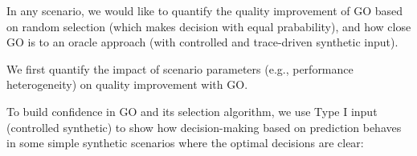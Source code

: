 In any scenario, we would like to quantify the quality improvement of GO based on random selection (which makes decision with equal prabability), and how close GO is to an oracle approach (with controlled and trace-driven synthetic input).



We first quantify the impact of scenario parameters (e.g., performance heterogeneity) on quality improvement with GO.

\begin{figure}[h!]
\centering
{}
\label{fig:behavioral}
\end{figure}

To build confidence in GO and its selection algorithm, we use Type I input (controlled synthetic) to show how decision-making based on prediction behaves in some simple synthetic scenarios where the optimal decisions are clear:

